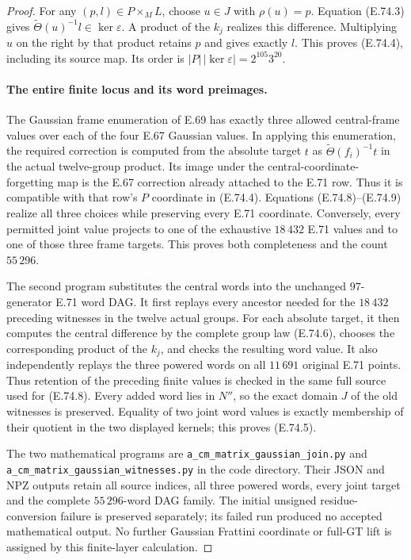 \begin{proof}
For any $(p,l)\in P\times_M L$, choose $u\in J$ with
$\rho(u)=p$. Equation (E.74.3) gives
$\widetilde\Theta(u)^{-1}l\in\ker\varepsilon$.
A product of the $k_j$ realizes this difference. Multiplying
$u$ on the right by that product retains $p$ and gives exactly
$l$. This proves (E.74.4), including its source map. Its order
is $|P|\,|\ker\varepsilon|=2^{105}3^{20}$.

\paragraph{The entire finite locus and its word preimages.}
The Gaussian frame enumeration of E.69 has exactly three
allowed central-frame values over each of the four E.67
Gaussian values. In applying this enumeration, the required
correction is computed from the absolute target $t$ as
$\widetilde\Theta(f_i)^{-1}t$ in the actual twelve-group
product. Its image under the central-coordinate-forgetting
map is the E.67 correction already attached to the E.71 row.
Thus it is compatible with that row's $P$ coordinate in
(E.74.4). Equations (E.74.8)--(E.74.9) realize all three
choices while preserving every E.71 coordinate. Conversely,
every permitted joint value projects to one of the exhaustive
$18\,432$ E.71 values and to one of those three frame targets.
This proves both completeness and the count $55\,296$.

The second program substitutes the central words into the
unchanged $97$-generator E.71 word DAG. It first replays every
ancestor needed for the $18\,432$ preceding witnesses in the
twelve actual groups. For each absolute target, it then
computes the central difference by the complete group law
(E.74.6), chooses the corresponding product of the $k_j$,
and checks the resulting word value. It also independently
replays the three powered words on all $11\,691$ original
E.71 points. Thus retention of the preceding finite values
is checked in the same full source used for (E.74.8).
Every added word lies in $N''$, so the exact domain $J$ of
the old witnesses is preserved. Equality of two joint word
values is exactly membership of their quotient in the two
displayed kernels; this proves (E.74.5).

The two mathematical programs are
\texttt{a\_cm\_matrix\_gaussian\_join.py} and
\texttt{a\_cm\_matrix\_gaussian\_witnesses.py} in the code
directory. Their JSON and NPZ outputs retain all source
indices, all three powered words, every joint target and
the complete $55\,296$-word DAG family. The initial unsigned
residue-conversion failure is preserved separately; its
failed run produced no accepted mathematical output.
No further Gaussian Frattini coordinate or full-GT lift is
assigned by this finite-layer calculation.
\end{proof}
